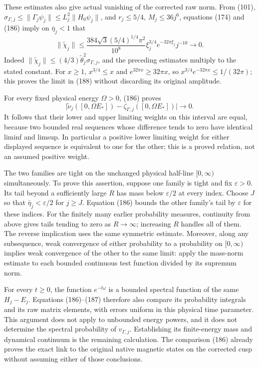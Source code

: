 \documentclass[
  11pt,
]{article}
\begin{document}
These estimates also give actual vanishing of the corrected raw norm.
From (101), \(\sigma_{\Gamma,j}\le\|\Gamma_j\psi_j\|
\le L_j^2\|H_0\psi_j\|\), and \(r_j\le5/4\), \(M_j\le36j^6\), equations
(174) and (186) imply on \(\bar\eta_j<1\) that \[
 \|\widetilde\chi_j\|
 \le\frac{384\sqrt3(5/4)^{1/4}\pi^2}{10^8}
          \xi_j^{3/4}e^{-32\pi\xi_j}j^{-10}
 \longrightarrow0 .
 \tag{188}
\] Indeed \(\|\widetilde\chi_j\|\le(4/3)\widetilde\theta_j^2
\sigma_{\Gamma,j}\), and the preceding estimates multiply to the stated
constant. For \(x\ge1\), \(x^{3/4}\le x\) and \(e^{32\pi x}\ge32\pi x\),
so \(x^{3/4}e^{-32\pi x}\le1/(32\pi)\); this proves the limit in (188)
without discarding its original amplitude.

For every fixed physical energy \(\Omega>0\), (186) proves \[
 \big|\widetilde\nu_j([0,\Omega E_*])
              -\zeta_{\Gamma,j}([0,\Omega E_*])\big|\longrightarrow0.
 \tag{189}
\] It follows that their lower and upper limiting weights on this
interval are equal, because two bounded real sequences whose difference
tends to zero have identical liminf and limsup. In particular a positive
lower limiting weight for either displayed sequence is equivalent to one
for the other; this is a proved relation, not an assumed positive
weight.

The two families are tight on the unchanged physical half-line
\([0,\infty)\) simultaneously. To prove this assertion, suppose one
family is tight and fix \(\varepsilon>0\). Its tail beyond a
sufficiently large \(R\) has mass below \(\varepsilon/2\) at every
index. Choose \(J\) so that \(\bar\eta_j<\varepsilon/2\) for \(j\ge J\).
Equation (186) bounds the other family's tail by \(\varepsilon\) for
these indices. For the finitely many earlier probability measures,
continuity from above gives tails tending to zero as \(R\to\infty\);
increasing \(R\) handles all of them. The reverse implication uses the
same symmetric estimate. Moreover, along any subsequence, weak
convergence of either probability to a probability on \([0,\infty)\)
implies weak convergence of the other to the same limit: apply the
mass-norm estimate to each bounded continuous test function divided by
its supremum norm.

For every \(t\ge0\), the function \(e^{-t\omega}\) is a bounded spectral
function of the same \(H_j-E_j\). Equations (186)--(187) therefore also
compare its probability integrals and its raw matrix elements, with
errors uniform in this physical time parameter. This argument does not
apply to unbounded energy powers, and it does not determine the spectral
probability of \(v_{\Gamma,j}\). Establishing its finite-energy mass and
dynamical continuum is the remaining calculation. The comparison (186)
already proves the exact link to the original native magnetic states on
the corrected cusp without assuming either of those conclusions.
\end{document}
